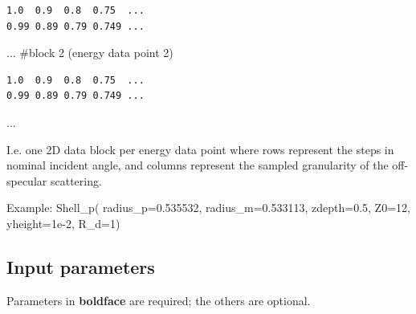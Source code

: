 \begin{verbatim}
1.0  0.9  0.8  0.75  ...
0.99 0.89 0.79 0.749 ...
\end{verbatim}

... \#block 2 (energy data point 2)

\begin{verbatim}
1.0  0.9  0.8  0.75  ...
0.99 0.89 0.79 0.749 ...
\end{verbatim}

...

I.e. one 2D data block per energy data point where rows represent the steps in nominal incident angle, and columns represent the sampled granularity of the off-specular scattering.

Example: Shell\_p( radius\_p=0.535532, radius\_m=0.533113, zdepth=0.5, Z0=12, yheight=1e-2, R\_d=1)

\subsection*{Input parameters}
Parameters in \textbf{boldface} are required; the others are optional.

